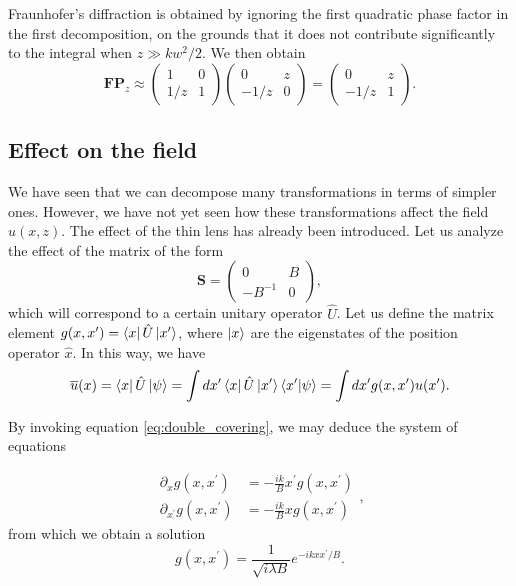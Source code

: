 \documentclass[a4paper,10pt]{report}
\begin{document}
Fraunhofer's diffraction is obtained by ignoring the first quadratic phase factor in the first decomposition, on the grounds that it does not contribute significantly to the integral when $z \gg kw^2/2$. We then obtain
\begin{equation}
    \mathbf{FP}_z \approx \begin{pmatrix}
        1 & 0 \\
        1/z & 1
    \end{pmatrix} \begin{pmatrix}
        0 & z \\
        -1/z & 0
    \end{pmatrix} = \begin{pmatrix}
        0 & z \\
        -1/z & 1
    \end{pmatrix} .
\end{equation}

\subsection{Effect on the field}

We have seen that we can decompose many transformations in terms of simpler ones. However, we have not yet seen how these transformations affect the field $u(x,z)$. The effect of the thin lens has already been introduced. Let us analyze the effect of the matrix of the form
\begin{equation}
    \mathbf{S} = \begin{pmatrix}
        0 & B \\
        -B^{-1} & 0
    \end{pmatrix},
\end{equation}
which will correspond to a certain unitary operator $\hat{U}$. Let us define the matrix element $g(x,x^\prime) = \bra{x} \hat{U} \ket{x^\prime}$, where $\ket{x}$ are the eigenstates of the position operator $\hat{x}$. In this way, we have
\begin{equation}
    \overline{u}(x) = \bra{x} \hat{U} \ket{\psi} = \int dx^\prime \bra{x} \hat{U} \ket{x^\prime} \braket{x^\prime | \psi} = \int dx^\prime g(x,x^\prime) u(x^\prime).
\end{equation}

By invoking equation \eqref{eq:double_covering}, we may deduce the system of equations

\begin{equation}
    \begin{aligned}
        \partial_x g(x,x^\prime) &= -\frac{ik}{B} x^\prime g(x,x^\prime) \\
        \partial_{x^\prime} g(x,x^\prime) &= -\frac{ik}{B} x g(x,x^\prime)
    \end{aligned},
\end{equation}
from which we obtain a solution
\begin{equation}
    g(x,x^\prime) = \frac{1}{\sqrt{i \lambda B}} e^{-ik x x^\prime / B}.
\end{equation}
\end{document}

